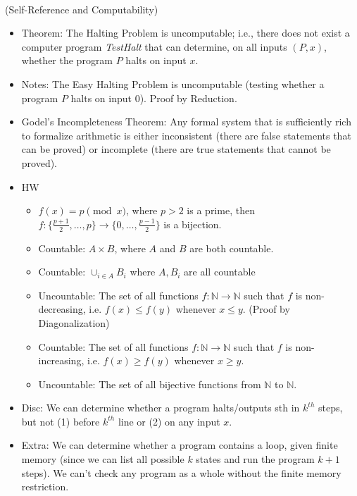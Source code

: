 \documentclass{article}
\begin{document}
 \\
(Self-Reference and Computability)
\begin{itemize}
	\item Theorem: The Halting Problem is uncomputable; i.e., there does not exist a computer program \textit{TestHalt} that can determine, on all inputs $(P, x)$, whether the program $P$ halts on input $x$.
	\item Notes: The Easy Halting Problem is uncomputable (testing whether a program $P$ halts on input 0). Proof by Reduction.
	\item Godel’s Incompleteness Theorem: Any formal system that is sufficiently rich to formalize arithmetic is either inconsistent (there are false statements that can be proved) or incomplete (there are true statements that cannot be proved).
	\item HW
	\begin{itemize}
		\item $f(x)=p\pmod{x}$, where $p>2$ is a prime, then $f:\{\frac{p+1}{2},\dots,p\} \rightarrow \{0,\dots,\frac{p-1}{2}\}$ is a bijection.
		\item Countable: $A\times B$, where $A$ and $B$ are both countable.
		\item Countable: $\cup_{i\in A} B_i$ where $A, B_i$ are all countable
		\item Uncountable: The set of all functions $f:\mathbb{N}\rightarrow\mathbb{N}$ such that $f$ is non-decreasing, i.e. $f(x)\leq f(y)$ whenever $x\leq y$. (Proof by Diagonalization)
		\item Countable: The set of all functions $f:\mathbb{N}\rightarrow\mathbb{N}$ such that $f$ is non-increasing, i.e. $f(x)\geq f(y)$ whenever $x\geq y$.
		\item Uncountable: The set of all bijective functions from $\mathbb{N}$ to $\mathbb{N}$.
	\end{itemize}
	\item Disc: We can determine whether a program halts/outputs sth in $k^{th}$ steps, but not (1) before $k^{th}$ line or (2) on any input $x$.
	\item Extra: We can determine whether a program contains a loop, given finite memory (since we can list all possible $k$ states and run the program $k+1$ steps). We can't check any program as a whole without the finite memory restriction.
\end{itemize}
\end{document}
